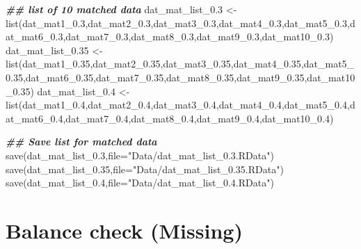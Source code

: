 \documentclass[
]{book}
\newenvironment{Shaded}{\begin{snugshade}}{\end{snugshade}}
\newcommand{\AttributeTok}[1]{\textcolor[rgb]{0.77,0.63,0.00}{#1}}
\newcommand{\DocumentationTok}[1]{\textcolor[rgb]{0.56,0.35,0.01}{\textbf{\textit{#1}}}}
\newcommand{\FloatTok}[1]{\textcolor[rgb]{0.00,0.00,0.81}{#1}}
\newcommand{\FunctionTok}[1]{\textcolor[rgb]{0.00,0.00,0.00}{#1}}
\newcommand{\NormalTok}[1]{#1}
\newcommand{\OtherTok}[1]{\textcolor[rgb]{0.56,0.35,0.01}{#1}}
\newcommand{\StringTok}[1]{\textcolor[rgb]{0.31,0.60,0.02}{#1}}
\theoremstyle{definition}
\theoremstyle{definition}
\theoremstyle{definition}
\theoremstyle{definition}
\theoremstyle{remark}
\begin{document}
\begin{Shaded}
\begin{Highlighting}[]
\DocumentationTok{\#\# list of 10 matched data }
\NormalTok{dat\_mat\_list\_0}\FloatTok{.3} \OtherTok{\textless{}{-}} \FunctionTok{list}\NormalTok{(dat\_mat1\_0}\FloatTok{.3}\NormalTok{,dat\_mat2\_0}\FloatTok{.3}\NormalTok{,dat\_mat3\_0}\FloatTok{.3}\NormalTok{,dat\_mat4\_0}\FloatTok{.3}\NormalTok{,dat\_mat5\_0}\FloatTok{.3}\NormalTok{,dat\_mat6\_0}\FloatTok{.3}\NormalTok{,dat\_mat7\_0}\FloatTok{.3}\NormalTok{,dat\_mat8\_0}\FloatTok{.3}\NormalTok{,dat\_mat9\_0}\FloatTok{.3}\NormalTok{,dat\_mat10\_0}\FloatTok{.3}\NormalTok{)}
\NormalTok{dat\_mat\_list\_0}\FloatTok{.35} \OtherTok{\textless{}{-}} \FunctionTok{list}\NormalTok{(dat\_mat1\_0}\FloatTok{.35}\NormalTok{,dat\_mat2\_0}\FloatTok{.35}\NormalTok{,dat\_mat3\_0}\FloatTok{.35}\NormalTok{,dat\_mat4\_0}\FloatTok{.35}\NormalTok{,dat\_mat5\_0}\FloatTok{.35}\NormalTok{,dat\_mat6\_0}\FloatTok{.35}\NormalTok{,dat\_mat7\_0}\FloatTok{.35}\NormalTok{,dat\_mat8\_0}\FloatTok{.35}\NormalTok{,dat\_mat9\_0}\FloatTok{.35}\NormalTok{,dat\_mat10\_0}\FloatTok{.35}\NormalTok{)}
\NormalTok{dat\_mat\_list\_0}\FloatTok{.4} \OtherTok{\textless{}{-}} \FunctionTok{list}\NormalTok{(dat\_mat1\_0}\FloatTok{.4}\NormalTok{,dat\_mat2\_0}\FloatTok{.4}\NormalTok{,dat\_mat3\_0}\FloatTok{.4}\NormalTok{,dat\_mat4\_0}\FloatTok{.4}\NormalTok{,dat\_mat5\_0}\FloatTok{.4}\NormalTok{,dat\_mat6\_0}\FloatTok{.4}\NormalTok{,dat\_mat7\_0}\FloatTok{.4}\NormalTok{,dat\_mat8\_0}\FloatTok{.4}\NormalTok{,dat\_mat9\_0}\FloatTok{.4}\NormalTok{,dat\_mat10\_0}\FloatTok{.4}\NormalTok{)}

\DocumentationTok{\#\# Save list for matched data}
\FunctionTok{save}\NormalTok{(dat\_mat\_list\_0}\FloatTok{.3}\NormalTok{,}\AttributeTok{file=}\StringTok{"Data/dat\_mat\_list\_0.3.RData"}\NormalTok{)}
\FunctionTok{save}\NormalTok{(dat\_mat\_list\_0}\FloatTok{.35}\NormalTok{,}\AttributeTok{file=}\StringTok{"Data/dat\_mat\_list\_0.35.RData"}\NormalTok{)}
\FunctionTok{save}\NormalTok{(dat\_mat\_list\_0}\FloatTok{.4}\NormalTok{,}\AttributeTok{file=}\StringTok{"Data/dat\_mat\_list\_0.4.RData"}\NormalTok{)}
\end{Highlighting}
\end{Shaded}

\hypertarget{balance-check-missing}{%
\section{Balance check (Missing)}\label{balance-check-missing}}
\end{document}
